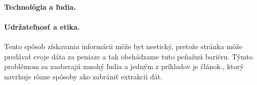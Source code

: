 \documentclass[10pt,twoside,slovak,a4paper]{article}
\begin{document}
\paragraph{Technológia a ľudia.}

\paragraph{Udržateľnosť a etika.}
Tento spôsob získavania informácii môže byt neetický, pretože stránka môže predávať svoje dáta za peniaze a tak obchádzame tuto peňažnú bariéru. Týmto problémom sa zaoberajú mnohý ľudia a jedným z príkladov je článok\cite{10092327}., ktorý navrhuje rôzne spôsoby ako zabrániť extrakcii dát.




\end{document}
